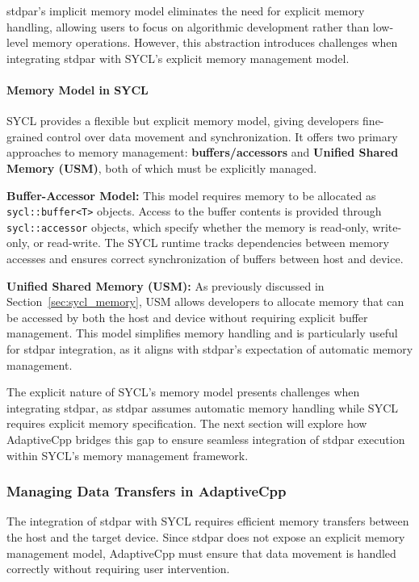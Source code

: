 stdpar’s implicit memory model eliminates the need for explicit memory handling, allowing users to focus on
algorithmic development rather than low-level memory operations. However, this abstraction introduces challenges
when integrating stdpar with SYCL’s explicit memory management model.

\paragraph{Memory Model in SYCL}
SYCL provides a flexible but explicit memory model, giving developers fine-grained control over data movement
and synchronization. It offers two primary approaches to memory management: \textbf{buffers/accessors} and
\textbf{Unified Shared Memory (USM)}, both of which must be explicitly managed.

\textbf{Buffer-Accessor Model:} This model requires memory to be allocated as \texttt{sycl::buffer<T>} objects.
Access to the buffer contents is provided through \texttt{sycl::accessor} objects, which specify whether the
memory is read-only, write-only, or read-write. The SYCL runtime tracks dependencies between memory accesses
and ensures correct synchronization of buffers between host and device.

\textbf{Unified Shared Memory (USM):} As previously discussed in Section~\ref{sec:sycl_memory}, USM allows
developers to allocate memory that can be accessed by both the host and device without requiring explicit buffer
management. This model simplifies memory handling and is particularly useful for stdpar integration, as it aligns
with stdpar's expectation of automatic memory management.

The explicit nature of SYCL’s memory model presents challenges when integrating stdpar, as stdpar assumes
automatic memory handling while SYCL requires explicit memory specification. The next section will explore
how AdaptiveCpp bridges this gap to ensure seamless integration of stdpar execution within SYCL’s memory
management framework.

\subsubsection{Managing Data Transfers in AdaptiveCpp}
\label{sec:data_transfers}

The integration of stdpar with SYCL requires efficient memory transfers between the host and the target device.
Since stdpar does not expose an explicit memory management model, AdaptiveCpp must ensure that data movement
is handled correctly without requiring user intervention.

